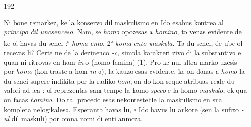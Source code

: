 \begin{VUpage}[196]{192}

Ni bone remarkez, ke la konservo dil maskulismo en Ido\nl
esabus kontrea al \textit{principo dil unasenceso}. Nam, se \textit{homo}\nl
opozesas a \textit{homino}, to venas evidente de ke ol havas du senci :\textsuperscript{e} \textit{homa ento}. 2\textsuperscript{e} \textit{homa ento maskula}. Ta du senci, de ube\nl
ol recevas li? Certe ne de la dezinenco \textit{-o}, simpla karakteri\cc
zivo di la substantivo e quan ni ritrovas en hom-\textit{in}-o (homo\nl
femina) (1). Pro ke nul altra marko uzesis por \textit{homo} (kon\cc
traste a hom-\textit{in}-o), la kauzo esas evidente, ke on donas a \textit{homo}\nl
la du senci supere indikita por la radiko \textit{hom}; on do kon\cc
seque atribuas reale du valori ad ica : ol reprezentas sam\cc
tempe la homo \textit{speco} e la homo \textit{maskulo}, ek qua on facas\nl
\textit{homino}. Do tal procedo esas nekontesteble la maskulismo en\nl
sua kompleta nelogikaleso. Esperanto havas lu, e Ido havus lu\nl
ankore (sen la sufixo \textit{-ul} dil maskuli) por omna nomi di\nl
enti anmoza.


\end{VUpage}

